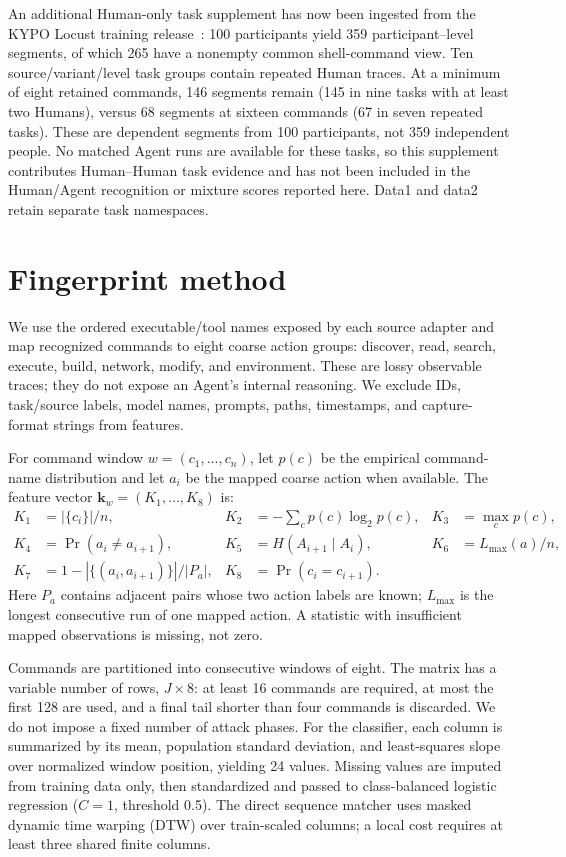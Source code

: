 \documentclass[11pt]{article}
\begin{document}
An additional Human-only task supplement has now been ingested from the KYPO Locust training release~\cite{kypo}: 100 participants yield 359 participant--level segments, of which 265 have a nonempty common shell-command view. Ten source/variant/level task groups contain repeated Human traces. At a minimum of eight retained commands, 146 segments remain (145 in nine tasks with at least two Humans), versus 68 segments at sixteen commands (67 in seven repeated tasks). These are dependent segments from 100 participants, not 359 independent people. No matched Agent runs are available for these tasks, so this supplement contributes Human--Human task evidence and has not been included in the Human/Agent recognition or mixture scores reported here. Data1 and data2 retain separate task namespaces.

\section{Fingerprint method}
We use the ordered executable/tool names exposed by each source adapter and map recognized commands to eight coarse action groups: discover, read, search, execute, build, network, modify, and environment. These are lossy observable traces; they do not expose an Agent's internal reasoning. We exclude IDs, task/source labels, model names, prompts, paths, timestamps, and capture-format strings from features.

For command window $w=(c_1,\ldots,c_n)$, let $p(c)$ be the empirical command-name distribution and let $a_i$ be the mapped coarse action when available. The feature vector $\mathbf{k}_w=(K_1,\ldots,K_8)$ is:
\begin{align*}
K_1&=|\{c_i\}|/n, & K_2&=-\sum_c p(c)\log_2 p(c), & K_3&=\max_c p(c),\\
K_4&=\Pr(a_i\ne a_{i+1}), & K_5&=H(A_{i+1}\mid A_i), & K_6&=L_{\max}(a)/n,\\
K_7&=1-|\{(a_i,a_{i+1})\}|/|P_a|, & K_8&=\Pr(c_i=c_{i+1}).
\end{align*}
Here $P_a$ contains adjacent pairs whose two action labels are known; $L_{\max}$ is the longest consecutive run of one mapped action. A statistic with insufficient mapped observations is missing, not zero.

Commands are partitioned into consecutive windows of eight. The matrix has a variable number of rows, $J\times8$: at least 16 commands are required, at most the first 128 are used, and a final tail shorter than four commands is discarded. We do not impose a fixed number of attack phases. For the classifier, each column is summarized by its mean, population standard deviation, and least-squares slope over normalized window position, yielding 24 values. Missing values are imputed from training data only, then standardized and passed to class-balanced logistic regression ($C=1$, threshold 0.5). The direct sequence matcher uses masked dynamic time warping (DTW) over train-scaled columns; a local cost requires at least three shared finite columns.
\end{document}
